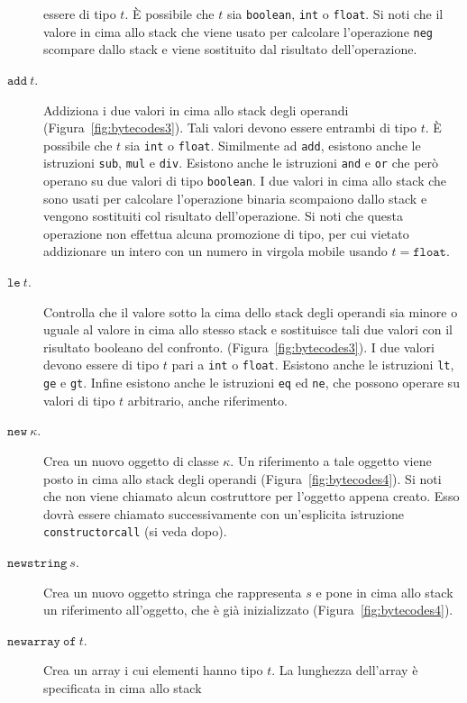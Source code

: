 \begin{description}
  essere di tipo $t$. \`E possibile che $t$ sia \texttt{boolean},
  \texttt{int} o \texttt{float}. Si noti che il valore in cima allo
  stack che viene usato per calcolare l'operazione \texttt{neg} scompare
  dallo stack e viene sostituito dal risultato dell'operazione.
\item[\underline{$\mathtt{add\ \mathit{t}}$}.]
  Addiziona i due valori in cima allo stack degli operandi
  (Figura~\ref{fig:bytecodes3}). Tali valori devono essere entrambi di
  tipo $t$. \`E possibile che $t$ sia \texttt{int} o \texttt{float}.
  Similmente ad \texttt{add}, esistono anche le istruzioni
  \texttt{sub}, \texttt{mul} e \texttt{div}. Esistono anche le
  istruzioni \texttt{and} e \texttt{or} che per\`o operano su due
  valori di tipo \texttt{boolean}. I due valori in cima allo
  stack che sono usati per calcolare l'operazione binaria scompaiono
  dallo stack e vengono sostituiti col risultato dell'operazione.
  Si noti che questa operazione non effettua alcuna promozione di tipo,
  per cui \e vietato addizionare un intero con un numero in virgola mobile
  usando $t=\mathtt{float}$.
\item[\underline{$\mathtt{le\ \mathit{t}}$}.]
  Controlla che il valore sotto la cima dello stack degli operandi sia
  minore o uguale al valore in cima allo stesso stack e sostituisce tali due
  valori con il risultato booleano del confronto.
  (Figura~\ref{fig:bytecodes3}). I due valori devono essere di tipo $t$ pari a
  \texttt{int} o \texttt{float}.
  Esistono anche le istruzioni \texttt{lt}, \texttt{ge} e \texttt{gt}.
  Infine esistono anche le istruzioni \texttt{eq} ed \texttt{ne}, che
  possono operare su valori di tipo $t$ arbitrario, anche riferimento.
\item[\underline{$\mathtt{new\ }\mathit{\kappa}$}.]
  Crea un nuovo oggetto di classe $\kappa$.
  Un riferimento a tale oggetto viene posto in cima allo stack degli
  operandi (Figura~\ref{fig:bytecodes4}). Si noti che non viene chiamato
  alcun costruttore per l'oggetto appena creato. Esso dovr\`a essere
  chiamato successivamente con un'esplicita istruzione
  \texttt{constructorcall} (si veda dopo).
\item[\underline{$\mathtt{newstring\ }\mathit{s}$}.]
  Crea un nuovo oggetto stringa che rappresenta $s$ e pone in cima allo
  stack un riferimento all'oggetto, che \`e gi\`a inizializzato
  (Figura~\ref{fig:bytecodes4}).
\item[\underline{$\mathtt{newarray\ of\ \mathit{t}}$}.]
  Crea un array i cui elementi
  hanno tipo $t$. La lunghezza dell'array \`e specificata in cima allo stack

\end{description}
